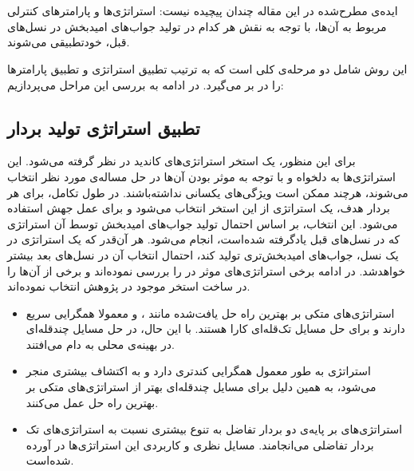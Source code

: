 \documentclass[12pt,a4paper]{article}
\theoremstyle{definition}
\theoremstyle{theorem}
\theoremstyle{definition}
\begin{document}

\newpage
\section{}
ایده‌ی مطرح‌شده در این مقاله چندان پیچیده نیست: استراتژی‌ها و پارامترهای کنترلی مربوط به آن‌ها، با توجه به نقش هر کدام در تولید جواب‌های امیدبخش در نسل‌های قبل، خودتطبیقی می‌شوند. 

این روش شامل دو مرحله‌ی کلی است که به ترتیب تطبیق استراتژی و تطبیق پارامترها را در بر می‌گیرد. در ادامه به بررسی این مراحل می‌پردازیم: 

\subsection{تطبیق استراتژی تولید بردار}

برای این منظور، یک استخر استراتژی‌های کاندید در نظر گرفته می‌شود. این استراتژی‌ها به دلخواه و با توجه به موثر بودن آن‌ها در حل مساله‌ی مورد نظر انتخاب می‌شوند، هرچند ممکن است ویژگی‌های یکسانی نداشته‌باشند. در طول تکامل، برای هر بردار هدف، یک استراتژی از این استخر انتخاب می‌شود و برای عمل‌ جهش استفاده می‌شود. این انتخاب، بر اساس احتمال تولید جواب‌های امیدبخش توسط آن استراتژی که در نسل‌های قبل یادگرفته شده‌است، انجام می‌شود. هر آن‌قدر که یک استراتژی در یک نسل، جواب‌های امیدبخش‌تری تولید کند، احتمال انتخاب آن در نسل‌های بعد بیشتر خواهدشد.
در ادامه برخی استراتژی‌های موثر در  را بررسی نموده‌اند و برخی از آن‌ها را در ساخت استخر موجود در پژوهش انتخاب نموده‌اند. 



\begin{itemize}
\renewcommand{\labelitemi}{$\bullet$}

\item
استراتژی‌های متکی بر بهترین راه‌ حل یافت‌شده مانند
،
 و
معمولا همگرایی سریع دارند و برای حل مسایل تک‌قله‌ای کارا هستند. با این حال، در حل مسایل چندقله‌ای در بهینه‌ی محلی به‌ دام می‌افتند.
\item
استراتژی 
به طور معمول همگرایی کندتری دارد و به اکتشاف بیشتری منجر می‌شود، به همین دلیل برای مسایل چندقله‌ای بهتر از استراتژی‌های متکی بر بهترین راه حل عمل می‌کنند.
\item
استراتژی‌های بر پایه‌ی دو بردار تفاضل به تنوع بیشتری نسبت به استراتژی‌های تک بردار تفاضلی می‌انجامند. مسایل نظری و کاربردی این استراتژی‌ها در \cite{11} آورده شده‌است.

\end{itemize}
\end{document}
